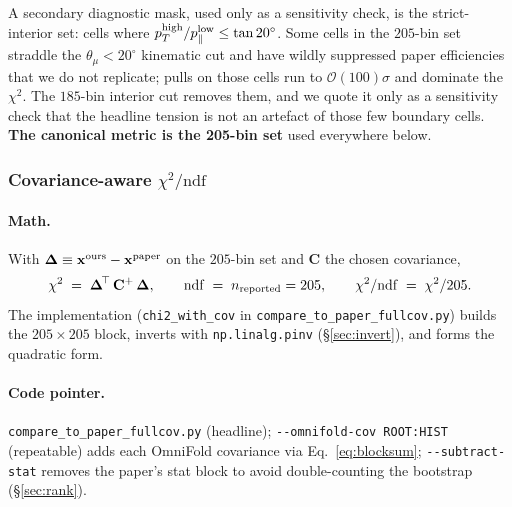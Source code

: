 A secondary diagnostic mask, used only as a sensitivity check, is the
strict-interior set: cells where $p_{T}^{\text{high}} / p_{\parallel}^{\text{low}}
\le \tan 20^{\circ}$. Some cells in the $205$-bin set straddle the
$\theta_{\mu}<20^{\circ}$ kinematic cut and have wildly suppressed
paper efficiencies that we do not replicate; pulls on those cells run
to $\mathcal{O}(100)\sigma$ and dominate the $\chi^{2}$. The $185$-bin
interior cut removes them, and we quote it only as a sensitivity check that
the headline tension is not an artefact of those few boundary cells.
\textbf{The canonical metric is the 205-bin set} used everywhere below.

\subsubsection{Covariance-aware $\chi^{2}/\mathrm{ndf}$}
\label{sec:chisq}

\paragraph{Math.}
With $\boldsymbol{\Delta}\equiv\mathbf{x}^{\text{ours}}-\mathbf{x}^{\text{paper}}$
on the $205$-bin set and $\mathbf{C}$ the chosen covariance,
\begin{equation}
\label{eq:chi2}
\chi^{2}
\;=\;
\boldsymbol{\Delta}^{\!\top}\,\mathbf{C}^{+}\,\boldsymbol{\Delta},
\qquad
\mathrm{ndf} \;=\; n_{\text{reported}} = 205,
\qquad
\chi^{2}/\mathrm{ndf} \;=\; \chi^{2}/205.
\end{equation}
The implementation (\texttt{chi2\_with\_cov} in
\texttt{compare\_to\_paper\_fullcov.py}) builds the $205\times205$
block, inverts with \texttt{np.linalg.pinv} (\S\ref{sec:invert}), and
forms the quadratic form.

\paragraph{Code pointer.}
\texttt{compare\_to\_paper\_fullcov.py} (headline);
\texttt{-{}-omnifold-cov ROOT:HIST} (repeatable) adds each OmniFold
covariance via Eq.~\eqref{eq:blocksum}; \texttt{-{}-subtract-stat}
removes the paper's stat block to avoid double-counting the bootstrap
(\S\ref{sec:rank}).

